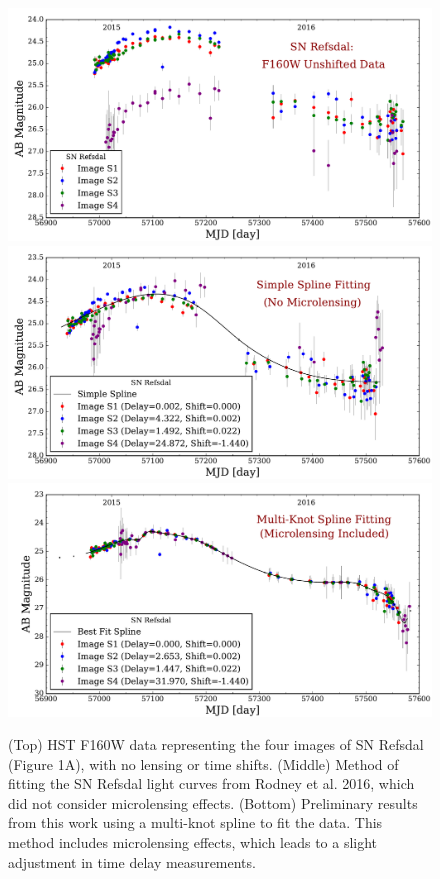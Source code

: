 \begin{figure}[p]
\centering
\includegraphics[width=.7\textwidth]{FIG/points_plot_2017.pdf}
\includegraphics[width=.7\textwidth]{FIG/refs_plot_2017.pdf}
\includegraphics[width=.7\textwidth]{FIG/spline_plot_2017.pdf}
\caption{(Top) HST F160W data representing the four images of SN
Refsdal (Figure 1A), with no lensing or time shifts. (Middle) Method of
fitting the SN Refsdal light curves from Rodney et al. 2016, which did
not consider microlensing effects. (Bottom) Preliminary results from 
this work using a multi-knot spline to fit the data. This method 
includes microlensing effects, which leads to a slight adjustment in 
time delay measurements. }
\end{figure}

\bigskip
